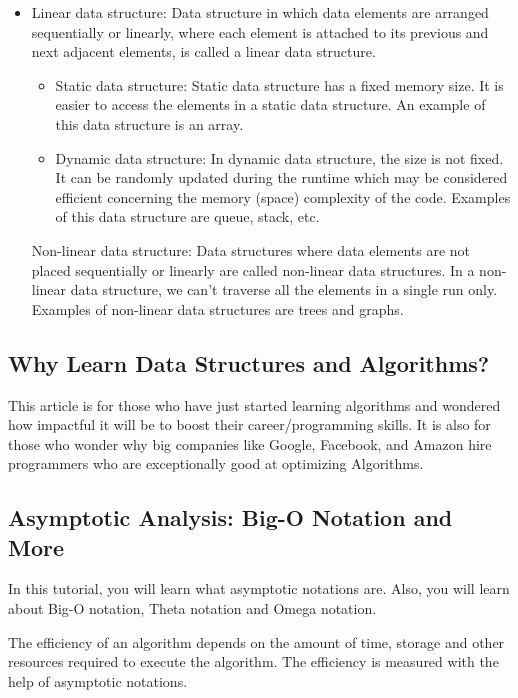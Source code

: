 \documentclass[conference]{IEEEtran}
\begin{document}
\begin{itemize}
\item Linear data structure: Data structure in which data elements are arranged sequentially or linearly, where each element is attached to its previous and next adjacent elements, is called a linear data structure. 
  
\begin{itemize}
\item Static data structure: Static data structure has a fixed memory size. It is easier to access the elements in a static data structure. 
An example of this data structure is an array.
\item Dynamic data structure: In dynamic data structure, the size is not fixed. It can be randomly updated during the runtime which may be considered efficient concerning the memory (space) complexity of the code. 
Examples of this data structure are queue, stack, etc.
\end{itemize}
Non-linear data structure: Data structures where data elements are not placed sequentially or linearly are called non-linear data structures. In a non-linear data structure, we can’t traverse all the elements in a single run only. 
Examples of non-linear data structures are trees and graphs.
\end{itemize}


\subsection{Why Learn Data Structures and Algorithms?}

This article is for those who have just started learning algorithms and wondered how impactful it will be to boost their career/programming skills. It is also for those who wonder why big companies like Google, Facebook, and Amazon hire programmers who are exceptionally good at optimizing Algorithms.


\subsection{Asymptotic Analysis: Big-O Notation and More}\label{SCM}
In this tutorial, you will learn what asymptotic notations are. Also, you will learn about Big-O notation, Theta notation and Omega notation.

The efficiency of an algorithm depends on the amount of time, storage and other resources required to execute the algorithm. The efficiency is measured with the help of asymptotic notations.
\end{document}
